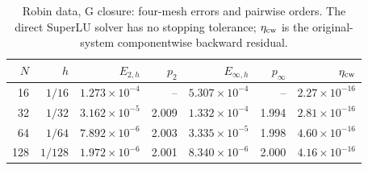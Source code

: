 \begin{table}[htbp]
\centering
\small
\setlength{\tabcolsep}{4pt}
\begin{tabular}{rrrrrrr}
\toprule
$N$ & $h$ & $E_{2,h}$ & $p_2$ & $E_{\infty,h}$ & $p_\infty$ & $\eta_{\rm cw}$ \\
\midrule
16 & $1/16$ & $1.273\times10^{-4}$ & -- & $5.307\times10^{-4}$ & -- & $2.27\times10^{-16}$ \\
32 & $1/32$ & $3.162\times10^{-5}$ & 2.009 & $1.332\times10^{-4}$ & 1.994 & $2.81\times10^{-16}$ \\
64 & $1/64$ & $7.892\times10^{-6}$ & 2.003 & $3.335\times10^{-5}$ & 1.998 & $4.60\times10^{-16}$ \\
128 & $1/128$ & $1.972\times10^{-6}$ & 2.001 & $8.340\times10^{-6}$ & 2.000 & $4.16\times10^{-16}$ \\
\bottomrule
\end{tabular}
\caption{Robin data, G closure: four-mesh errors and pairwise orders. The direct SuperLU solver has no stopping tolerance; $\eta_{\rm cw}$ is the original-system componentwise backward residual.}
\label{tab:refinement-robin-ghost}
\end{table}
